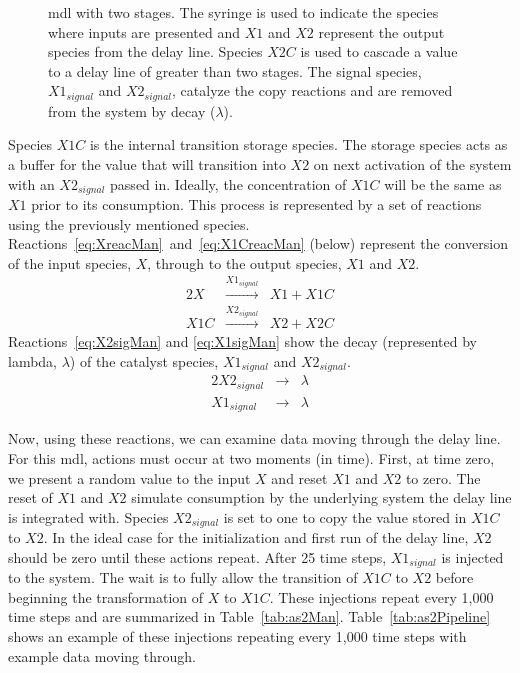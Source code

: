 \begin{figure}[ht]
	\caption[Two Stage Manual Copy Delay Line]{\Gls{mdl} with two stages. The syringe is used to indicate the species where inputs are presented and $X1$ and $X2$ represent the output species from the delay line. Species $X2C$ is used to cascade a value to a delay line of greater than two stages. The signal species, $X1_{signal}$ and $X2_{signal}$, catalyze the copy reactions and are removed from the system by decay ($\lambda$).}
	\label{fig:manualprop_n_2}
\end{figure}

Species $X1C$ is the internal transition storage species. The storage species acts as a buffer for the value that will transition into $X2$ on next activation of the system with an $X2_{signal}$ passed in. Ideally, the concentration of $X1C$ will be the same as $X1$ prior to its consumption. This process is represented by a set of reactions using the previously mentioned species. Reactions~\ref{eq:XreacMan}~and~\ref{eq:X1CreacMan} (below) represent the conversion of the input species, $X$, through to the output species, $X1$ and $X2$.
\begin{alignat}{2}
X & \xrightarrow{X1_{signal}} & X1 + X1C  \label{eq:XreacMan} \\
X1C & \xrightarrow{X2_{signal}} & X2 + X2C \label{eq:X1CreacMan}
\end{alignat}
Reactions~\ref{eq:X2sigMan} and \ref{eq:X1sigMan} show the decay (represented by lambda, $\lambda$) of the catalyst species, $X1_{signal}$ and $X2_{signal}$.
\begin{alignat}{2}
X2_{signal} & \rightarrow & \lambda \label{eq:X2sigMan} \\
X1_{signal} & \rightarrow & \lambda \label{eq:X1sigMan}
\end{alignat}

Now, using these reactions, we can examine data moving through the delay line. For this \gls{mdl}, actions must occur at two moments (in time). First, at time zero, we present a random value to the input $X$ and reset $X1$ and $X2$ to zero. The reset of $X1$ and $X2$ simulate consumption by the underlying system the delay line is integrated with. Species $X2_{signal}$ is set to one to copy the value stored in $X1C$ to $X2$. In the ideal case for the initialization and first run of the delay line, $X2$ should be zero until these actions repeat. After 25 time steps, $X1_{signal}$ is injected to the system. The wait is to fully allow the transition of $X1C$ to $X2$ before beginning the transformation of $X$ to $X1C$. These injections repeat every 1,000 time steps and are summarized in Table~\ref{tab:as2Man}. Table~\ref{tab:as2Pipeline} shows an example of these injections repeating every 1,000 time steps with example data moving through.

